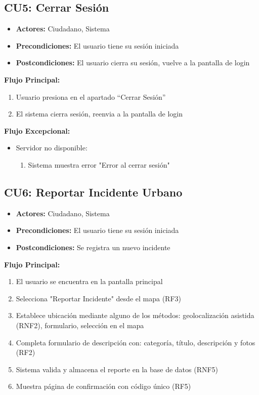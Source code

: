 \begin{multicols}{2}
\subsection*{CU5: Cerrar Sesión}
\begin{itemize}
    \item \textbf{Actores:} Ciudadano, Sistema
    \item \textbf{Precondiciones:} El usuario tiene su sesión iniciada
    \item \textbf{Postcondiciones:} El usuario cierra su sesión, vuelve a la pantalla de login
\end{itemize}
\textbf{Flujo Principal:}
\begin{enumerate}
    \item Usuario presiona en el apartado ``Cerrar Sesión''
    \item El sistema cierra sesión, reenvia a la pantalla de login
\end{enumerate}

\textbf{Flujo Excepcional:}
\begin{itemize}
    \item Servidor no disponible:
    \begin{enumerate}
        \item Sistema muestra error "Error al cerrar sesión"
    \end{enumerate}
\end{itemize}

\subsection*{CU6: Reportar Incidente Urbano}
\begin{itemize}
    \item \textbf{Actores:} Ciudadano, Sistema
    \item \textbf{Precondiciones:} El usuario tiene su sesión iniciada
    \item \textbf{Postcondiciones:} Se registra un nuevo incidente
\end{itemize}
\textbf{Flujo Principal:}
\begin{enumerate}
    \item El usuario se encuentra en la pantalla principal
    \item Selecciona "Reportar Incidente" desde el mapa (RF3)
    \item Establece ubicación mediante alguno de los métodos: geolocalización asistida (RNF2), formulario, selección en el mapa
    \item Completa formulario de descripción con: categoría, título, descripción y fotos (RF2)
    \item Sistema valida y almacena el reporte en la base de datos (RNF5)
    \item Muestra página de confirmación con código único (RF5)
\end{enumerate}


\end{multicols}

